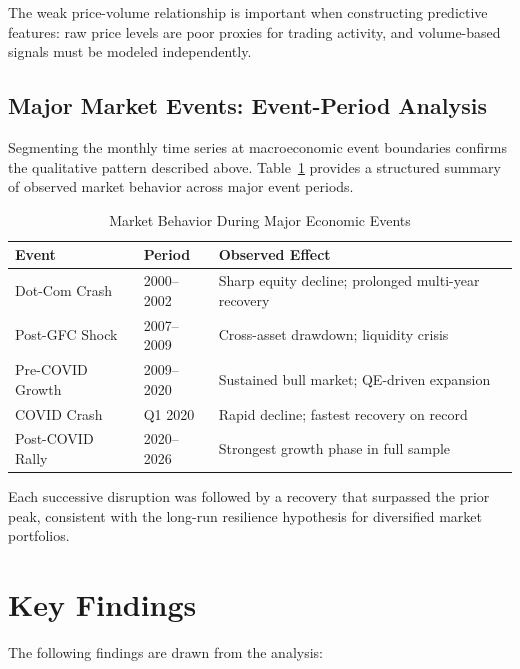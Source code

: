 \documentclass[10pt,a4paper,twocolumn]{article}
\begin{document}
The weak price-volume relationship is important when constructing predictive features: raw price levels are poor proxies for trading activity, and volume-based signals must be modeled independently.

\subsection{Major Market Events: Event-Period Analysis}

Segmenting the monthly time series at macroeconomic event boundaries confirms the qualitative pattern described above. Table~\ref{tab:event_summary} provides a structured summary of observed market behavior across major event periods.

\begin{table}[H]
\centering
\caption{Market Behavior During Major Economic Events}
\label{tab:event_summary}
\small
\begin{tabular}{@{}p{2.2cm}p{1.4cm}p{3.3cm}@{}}
\toprule
\textbf{Event} & \textbf{Period} & \textbf{Observed Effect} \\
\midrule
Dot-Com Crash    & 2000--2002 & Sharp equity decline; prolonged multi-year recovery \\
Post-GFC Shock   & 2007--2009 & Cross-asset drawdown; liquidity crisis \\
Pre-COVID Growth & 2009--2020 & Sustained bull market; QE-driven expansion \\
COVID Crash      & Q1 2020    & Rapid decline; fastest recovery on record \\
Post-COVID Rally & 2020--2026 & Strongest growth phase in full sample \\
\bottomrule
\end{tabular}
\end{table}

Each successive disruption was followed by a recovery that surpassed the prior peak, consistent with the long-run resilience hypothesis for diversified market portfolios.

\section{Key Findings}

The following findings are drawn from the analysis:
\end{document}
